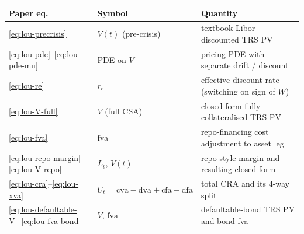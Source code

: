 \documentclass[11pt,a4paper]{article}
\begin{document}
\begin{validation}
\smallskip
\begin{tabular}{@{}p{2.8cm}p{3.8cm}p{6.2cm}@{}}
\toprule
Paper eq.                            & Symbol                & Quantity \\
\midrule
\eqref{eq:lou-precrisis}             & $V(t)$ (pre-crisis)    & textbook Libor-discounted TRS PV \\
\eqref{eq:lou-pde}--\eqref{eq:lou-pde-mu} & PDE on $V$         & pricing PDE with separate drift / discount \\
\eqref{eq:lou-re}                    & $r_e$                  & effective discount rate (switching on sign of $W$) \\
\eqref{eq:lou-V-full}                & $V$ (full CSA)         & closed-form fully-collateralised TRS PV \\
\eqref{eq:lou-fva}                   & $\mathrm{fva}$         & repo-financing cost adjustment to asset leg \\
\eqref{eq:lou-repo-margin}--\eqref{eq:lou-V-repo} & $L_t$, $V(t)$ & repo-style margin and resulting closed form \\
\eqref{eq:lou-cra}--\eqref{eq:lou-xva} & $U_t = \mathrm{cva} - \mathrm{dva} + \mathrm{cfa} - \mathrm{dfa}$ & total CRA and its 4-way split \\
\eqref{eq:lou-defaultable-V}--\eqref{eq:lou-fva-bond} & $V$, $\mathrm{fva}$ & defaultable-bond TRS PV and bond-fva \\
\bottomrule
\end{tabular}
\smallskip


\end{validation}
\end{document}
